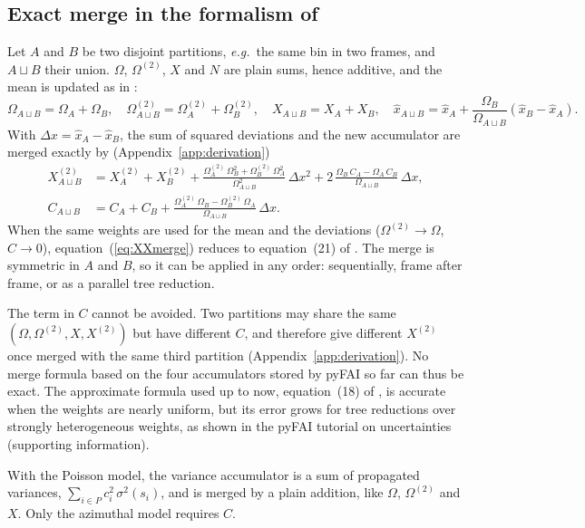 \documentclass{iucrjournals}
\newcommand{\mean}[1]{\widehat{#1}}
\newcommand{\Om}{\Omega}
\newcommand{\OmS}{\Omega^{(2)}}
\newcommand{\XX}{X^{(2)}}
\newcommand{\AB}{{A\sqcup B}}
\begin{document}
\subsection[Exact merge in the formalism of Schubert \& Gertz (2018)]{Exact merge in the formalism of \protect{}}
\label{sec:merge}

Let $A$ and $B$ be two disjoint partitions, \emph{e.g.}\ the same bin in two frames, and $\AB$ their union.
$\Om$, $\OmS$, $X$ and $N$ are plain sums, hence additive, and the mean is updated as in :
\begin{equation}
  \Om_\AB = \Om_A+\Om_B, \quad \OmS_\AB = \OmS_A+\OmS_B, \quad X_\AB = X_A+X_B, \quad
  \mean{x}_\AB = \mean{x}_A + \frac{\Om_B}{\Om_\AB}\left(\mean{x}_B-\mean{x}_A\right).
  \label{eq:additive}
\end{equation}
With $\Delta x = \mean{x}_A-\mean{x}_B$, the sum of squared deviations and the new accumulator are merged exactly by (Appendix~\ref{app:derivation})
\begin{align}
  \XX_\AB &= \XX_A + \XX_B + \frac{\OmS_A\,\Om_B^2+\OmS_B\,\Om_A^2}{\Om_\AB^2}\,\Delta x^2
            + 2\,\frac{\Om_B\,C_A-\Om_A\,C_B}{\Om_\AB}\,\Delta x, \label{eq:XXmerge}\\
  C_\AB  &= C_A + C_B + \frac{\OmS_A\,\Om_B-\OmS_B\,\Om_A}{\Om_\AB}\,\Delta x. \label{eq:Cmerge}
\end{align}
When the same weights are used for the mean and the deviations ($\OmS\to\Om$, $C\to0$), equation~(\ref{eq:XXmerge}) reduces to equation~(21) of .
The merge is symmetric in $A$ and $B$, so it can be applied in any order: sequentially, frame after frame, or as a parallel tree reduction.

The term in $C$ cannot be avoided.
Two partitions may share the same $(\Om,\OmS,X,\XX)$ but have different $C$, and therefore give different $\XX$ once merged with the same third partition (Appendix~\ref{app:derivation}).
No merge formula based on the four accumulators stored by pyFAI so far can thus be exact.
The approximate formula used up to now, equation~(18) of , is accurate when the weights are nearly uniform, but its error grows for tree reductions over strongly heterogeneous weights, as shown in the pyFAI tutorial on uncertainties (supporting information).

With the Poisson model, the variance accumulator is a sum of propagated variances, $\sum_{i\in P}c_i^2\,\sigma^2(s_i)$, and is merged by a plain addition, like $\Om$, $\OmS$ and $X$.
Only the azimuthal model requires $C$.
\end{document}
